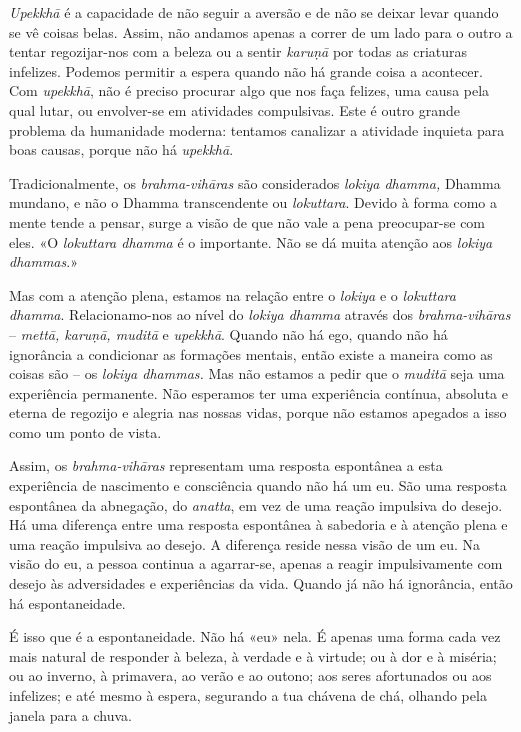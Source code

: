 \emph{Upekkhā} é a capacidade de não seguir a aversão e de não se deixar levar
quando se vê coisas belas. Assim, não andamos apenas a correr de um lado para o
outro a tentar regozijar-nos com a beleza ou a sentir \emph{karuṇā} por todas
as criaturas infelizes. Podemos permitir a espera quando não há grande coisa a
acontecer. Com \emph{upekkhā}, não é preciso procurar algo que nos faça felizes,
uma causa pela qual lutar, ou envolver-se em atividades compulsivas. Este é
outro grande problema da humanidade moderna: tentamos canalizar a atividade
inquieta para boas causas, porque não há \emph{upekkhā}.

Tradicionalmente, os \emph{brahma-vihāras} são considerados \emph{lokiya
  dhamma,} Dhamma mundano, e não o Dhamma transcendente ou \emph{lokuttara}.
Devido à forma como a mente tende a pensar, surge a visão de que não vale a pena
preocupar-se com eles. «O \emph{lokuttara dhamma} é o importante. Não se dá
muita atenção aos \emph{lokiya dhammas}.»

Mas com a atenção plena, estamos na relação entre o \emph{lokiya} e o
\emph{lokuttara dhamma}. Relacionamo-nos ao nível do \emph{lokiya dhamma}
através dos \emph{brahma-vihāras} -- \emph{mettā, karuṇā, muditā} e
\emph{upekkhā}. Quando não há ego, quando não há ignorância a condicionar as
formações mentais, então existe a maneira como as coisas são -- os \emph{lokiya
  dhammas.} Mas não estamos a pedir que o \emph{muditā} seja uma experiência
permanente. Não esperamos ter uma experiência contínua, absoluta e eterna de
regozijo e alegria nas nossas vidas, porque não estamos apegados a isso como um
ponto de vista.

Assim, os \emph{brahma-vihāras} representam uma resposta espontânea a esta
experiência de nascimento e consciência quando não há um eu. São uma resposta
espontânea da abnegação, do \emph{anatta}, em vez de uma reação impulsiva do
desejo. Há uma diferença entre uma resposta espontânea à sabedoria e à atenção
plena e uma reação impulsiva ao desejo. A diferença reside nessa visão de um eu.
Na visão do eu, a pessoa continua a agarrar-se, apenas a reagir impulsivamente
com desejo às adversidades e experiências da vida. Quando já não há ignorância,
então há espontaneidade.

É isso que é a espontaneidade. Não há «eu» nela. É apenas uma forma cada vez
mais natural de responder à beleza, à verdade e à virtude; ou à dor e à miséria;
ou ao inverno, à primavera, ao verão e ao outono; aos seres afortunados ou aos
infelizes; e até mesmo à espera, segurando a tua chávena de chá, olhando pela
janela para a chuva.

